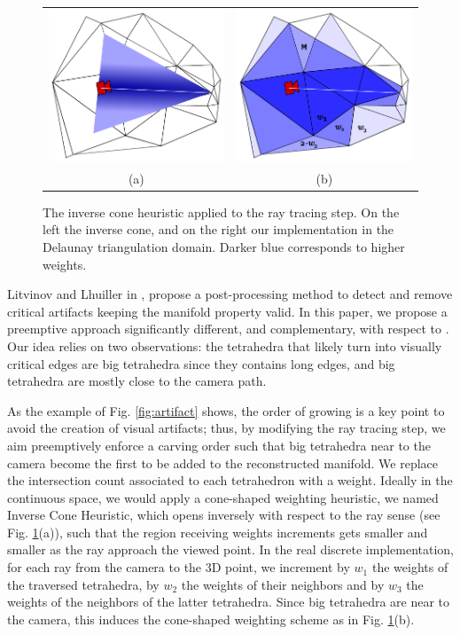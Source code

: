 \begin{figure}
\centering
\begin{tabular}{cc}
\includegraphics[width=0.35\columnwidth]{./img//conicCarvingContinueOK}&
\includegraphics[width=0.35\columnwidth]{./img//conicCarvingOK}\\
(a) & (b)
\end{tabular}
\caption{The inverse cone heuristic applied to the ray tracing step. On the left the inverse cone, and on the right our implementation in the Delaunay triangulation domain. Darker blue corresponds to higher weights.}
\label{fig:ConicCarving}
\end{figure}


Litvinov and Lhuiller in \cite{litvinov_Lhiuller14}, propose a post-processing method to detect and remove critical artifacts keeping the manifold property valid.
In this paper, we propose a preemptive approach significantly different, and complementary, with respect to \cite{litvinov_Lhiuller14}. 
Our idea relies on two observations: the tetrahedra that likely turn into visually critical edges are big tetrahedra since they contains long edges, and big tetrahedra are mostly close to the camera path.

As the example of Fig. \ref{fig:artifact} shows, the order of growing is a key point to avoid the creation of visual artifacts; thus,
 by modifying the ray tracing step, we aim preemptively enforce a carving order such that big tetrahedra near to the camera become the first to be added to the reconstructed manifold.
We replace the intersection count associated to each tetrahedron with a weight. Ideally in the continuous space, we would apply  a cone-shaped weighting heuristic, we named Inverse Cone Heuristic, which opens inversely with respect to the ray sense (see Fig. \ref{fig:ConicCarving}(a)),  such that the region receiving weights increments gets smaller and smaller as the ray approach the viewed point.
In the real discrete implementation, for each ray from the camera to the 3D point, we increment by $w_1$ the weights of the traversed tetrahedra, by $w_2$ the weights of their neighbors and by $w_3$ the weights of the neighbors of the latter tetrahedra.
Since big tetrahedra are near to the camera, this induces the cone-shaped weighting scheme as in Fig. \ref{fig:ConicCarving}(b).

